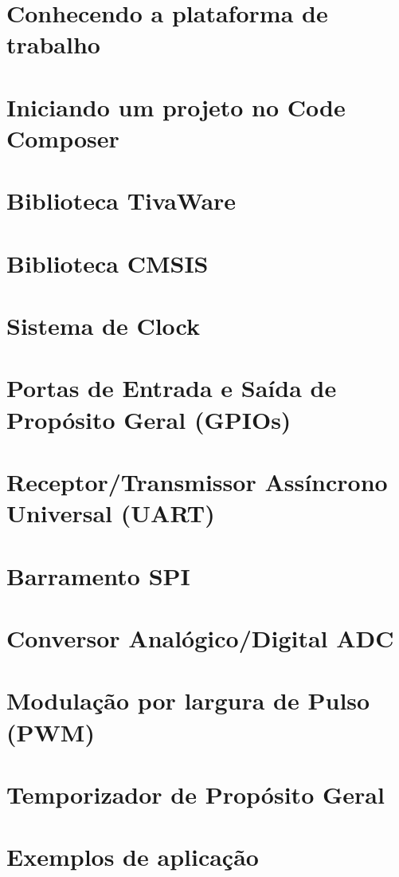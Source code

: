 \documentclass[a4paper,10pt,oneside]{book}
\begin{document}
\chapter{Conhecendo a plataforma de trabalho}


\chapter{Iniciando um projeto no Code Composer}


\chapter{Biblioteca TivaWare}


\chapter{Biblioteca CMSIS}


\chapter{Sistema de Clock}


\chapter{Portas de Entrada e Saída de Propósito Geral (GPIOs)}


\chapter{Receptor/Transmissor Assíncrono Universal (UART)}


\chapter{Barramento SPI}


\chapter{Conversor Analógico/Digital ADC}


\chapter{Modulação por largura de Pulso (PWM)}


\chapter{Temporizador de Propósito Geral}



\chapter{Exemplos de aplicação}





\end{document}
